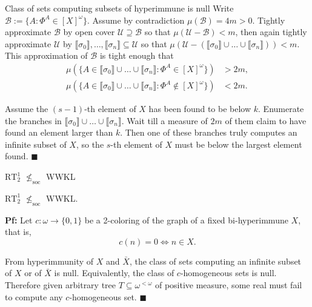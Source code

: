 \begin{frame}{Class of sets computing subsets of hyperimmune is null}
  Write $\mathcal{B} :=\{A: \Phi^A\in[X]^\omega\}$.
  Assume by contradiction $\mu(\mathcal{B})=4m>0$. Tightly approximate
  $\mathcal{B}$ by open cover $\mathcal{U}\supseteq\mathcal{B}$ so that
  $\mu(\mathcal{U}-\mathcal{B})<m$, then again tightly approximate
  $\mathcal{U}$ by $\llbracket\sigma_0\rrbracket,
  \ldots,\llbracket\sigma_n\rrbracket \subseteq\mathcal{U}$ so
  that $\mu(\mathcal{U}-(\llbracket\sigma_0\rrbracket \cup\ldots
  \cup\llbracket\sigma_n\rrbracket)) <m$. This approximation of
  $\mathcal{B}$ is tight enough that
  \begin{align*}
    \mu(\{A\in\llbracket\sigma_0\rrbracket \cup\ldots\cup
    \llbracket\sigma_n\rrbracket: \Phi^A\in[X]^\omega\}) &>2m,\\
    \mu(\{A\in\llbracket\sigma_0\rrbracket \cup\ldots\cup
    \llbracket\sigma_n\rrbracket: \Phi^A\not\in[X]^\omega\}) &<2m.
  \end{align*}

  Assume the $(s-1)$-th element of $X$ has been found to be below $k$.
  Enumerate the branches in $\llbracket\sigma_0\rrbracket \cup\ldots\cup
  \llbracket\sigma_n\rrbracket$.  Wait
  till a measure of $2m$ of them claim to have found an element larger than
  $k$. Then one of these branches truly computes an infinite subset of
  $X$, so the $s$-th element of $X$ must be below the largest element
  found. $\blacksquare$
\end{frame}

\begin{frame}{$\text{RT}_2^1$ $\nleq_{\text{soc}}$ WWKL}
  \begin{thm}
    $\text{RT}_2^1$ $\nleq_{\text{soc}}$ WWKL.
  \end{thm}

  \vspace{1em}
  \textbf{Pf:} Let $c:\omega\rightarrow\{0,1\}$ be a 2-coloring of the
  graph of a fixed bi-hyperimmune $X$, that is,
  \[c(n)=0 \Leftrightarrow n\in X.\]
  
  From hyperimmunity of $X$ and $\bar{X}$, the class of sets computing an
  infinite subset of $X$ or of $\bar{X}$ is null. Equivalently, the class
  of $c$-homogeneous sets is null. Therefore given arbitrary tree
  $T\subseteq\omega^{<\omega}$ of positive measure, some real must fail to
  compute any $c$-homogeneous set. $\blacksquare$
\end{frame}

